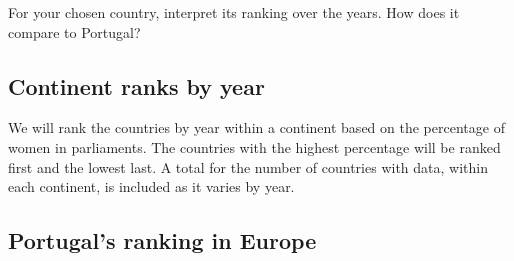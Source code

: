\documentclass[a4paper,9pt,twocolumn,twoside,printwatermark=false]{pinp}
\begin{document}
For your chosen country, interpret its ranking over the years. How does
it compare to Portugal?

\subsection{Continent ranks by year}\label{continent-ranks-by-year}

We will rank the countries by year within a continent based on the
percentage of women in parliaments. The countries with the highest
percentage will be ranked first and the lowest last. A total for the
number of countries with data, within each continent, is included as it
varies by year.

\begin{Shaded}
\end{Shaded}

\subsection{Portugal's ranking in
Europe}\label{portugals-ranking-in-europe}
\end{document}
